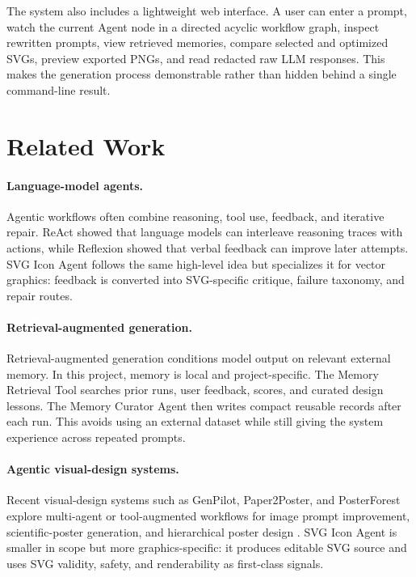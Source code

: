 \documentclass[10pt]{article}
\newcommand{\systemname}{SVG Icon Agent}
\begin{document}
The system also includes a lightweight web interface. A user can enter a prompt, watch the current Agent node in a directed acyclic workflow graph, inspect rewritten prompts, view retrieved memories, compare selected and optimized SVGs, preview exported PNGs, and read redacted raw LLM responses. This makes the generation process demonstrable rather than hidden behind a single command-line result.

\section{Related Work}

\paragraph{Language-model agents.}
Agentic workflows often combine reasoning, tool use, feedback, and iterative repair. ReAct \citep{yao2023react} showed that language models can interleave reasoning traces with actions, while Reflexion \citep{shinn2023reflexion} showed that verbal feedback can improve later attempts. \systemname{} follows the same high-level idea but specializes it for vector graphics: feedback is converted into SVG-specific critique, failure taxonomy, and repair routes.

\paragraph{Retrieval-augmented generation.}
Retrieval-augmented generation \citep{lewis2020rag} conditions model output on relevant external memory. In this project, memory is local and project-specific. The Memory Retrieval Tool searches prior runs, user feedback, scores, and curated design lessons. The Memory Curator Agent then writes compact reusable records after each run. This avoids using an external dataset while still giving the system experience across repeated prompts.

\paragraph{Agentic visual-design systems.}
Recent visual-design systems such as GenPilot, Paper2Poster, and PosterForest explore multi-agent or tool-augmented workflows for image prompt improvement, scientific-poster generation, and hierarchical poster design \citep{genpilot,paper2poster,posterforest}. \systemname{} is smaller in scope but more graphics-specific: it produces editable SVG source and uses SVG validity, safety, and renderability as first-class signals.
\end{document}

